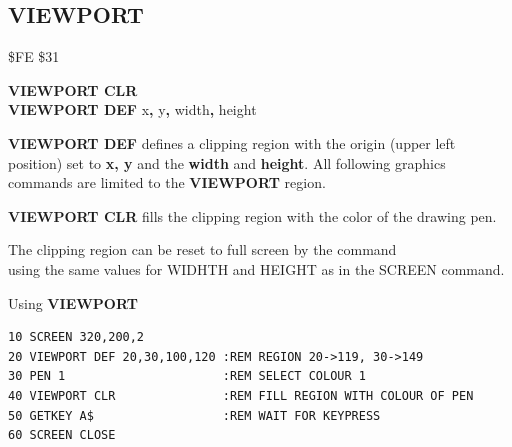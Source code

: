 \subsection{VIEWPORT}
\begin{description}[leftmargin=2cm,style=nextline]
\item [Token:] \$FE \$31
\item [Format:] {\bf VIEWPORT CLR} \\
		{\bf VIEWPORT DEF} x{\bf,} y{\bf,} width{\bf,} height
\item [Usage:] {\bf VIEWPORT DEF} defines a clipping region with the origin
               (upper left position) set to {\bf x, y} and the {\bf width}
               and {\bf height}.
               All following graphics commands are limited to the {\bf VIEWPORT}
               region.

               {\bf VIEWPORT CLR} fills the clipping region
               with the color of the drawing pen.

\item [Remarks:] The clipping region can be reset to full screen by the command\\
                using the same values for WIDHTH and HEIGHT as in the SCREEN command.

\item [Example:] Using {\bf VIEWPORT}
\begin{tcolorbox}[colback=black,coltext=white]
\verbatimfont{\codefont}
\begin{verbatim}
10 SCREEN 320,200,2
20 VIEWPORT DEF 20,30,100,120 :REM REGION 20->119, 30->149
30 PEN 1                      :REM SELECT COLOUR 1
40 VIEWPORT CLR               :REM FILL REGION WITH COLOUR OF PEN
50 GETKEY A$                  :REM WAIT FOR KEYPRESS
60 SCREEN CLOSE
\end{verbatim}
\end{tcolorbox}
\end{description}


\newpage
